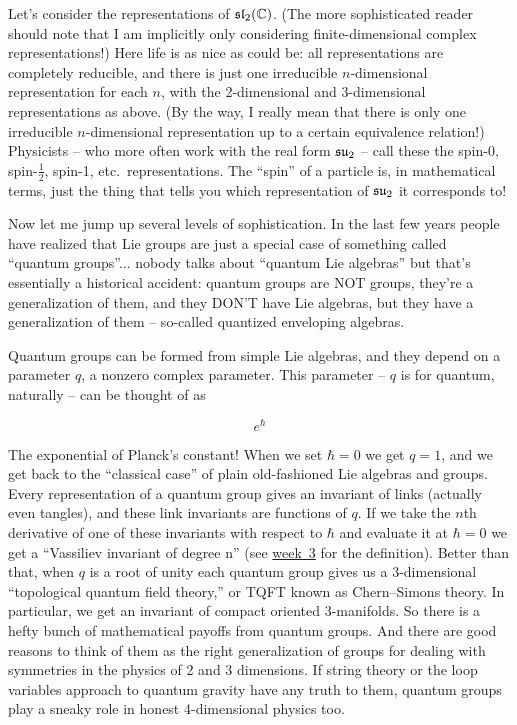 Let's consider the representations of $\mathfrak{sl}_2(\mathbb C)$.  (The more sophisticated reader should note that I am implicitly only considering finite-dimensional complex representations!)  Here life is as nice as could be: all representations are completely reducible, and there is just one irreducible $n$-dimensional representation for each $n$, with the 2-dimensional and 3-dimensional representations as above.  (By the way, I really mean that there is only one irreducible $n$-dimensional representation up to a certain equivalence relation!)  Physicists -- who more often work with the real form $\mathfrak{su}_2$ -- call these the spin-0, spin-$\frac{1}{2}$, spin-1, etc.\ representations.  The ``spin'' of a particle is, in mathematical terms, just the thing that tells you which representation of $\mathfrak{su}_2$ it corresponds to!

Now let me jump up several levels of sophistication.  In the last few years people have realized that Lie groups are just a special case of something called ``quantum groups''... nobody talks about ``quantum Lie algebras'' but that's essentially a historical accident: quantum groups are NOT groups, they're a generalization of them, and they DON'T have Lie algebras, but they have a generalization of them -- so-called quantized enveloping algebras.

Quantum groups can be formed from simple Lie algebras, and they depend on a parameter $q$, a nonzero complex parameter.  This parameter -- $q$ is for quantum, naturally -- can be thought of as

\[e^\hbar\]

The exponential of Planck's constant!  When we set $\hbar = 0$ we get $q = 1$, and we get back to the ``classical case'' of plain old-fashioned Lie algebras and groups.  Every representation of a quantum group gives an invariant of links (actually even tangles), and these link invariants are functions of $q$. If we take the $n$th derivative of one of these invariants with respect to $\hbar$ and evaluate it at $\hbar = 0$ we get a ``Vassiliev invariant of degree n'' (see {\hyperref[week3]{week~3}} for the definition).  Better than that, when $q$ is a root of unity each quantum group gives us a 3-dimensional ``topological quantum field theory,'' or TQFT known as Chern--Simons theory.  In particular, we get an invariant of compact oriented 3-manifolds.  So there is a hefty bunch of mathematical payoffs from quantum groups.  And there are good reasons to think of them as the right generalization of groups for dealing with symmetries in the physics of 2 and 3 dimensions.  If string theory or the loop variables approach to quantum gravity have any truth to them, quantum groups play a sneaky role in honest 4-dimensional physics too.

